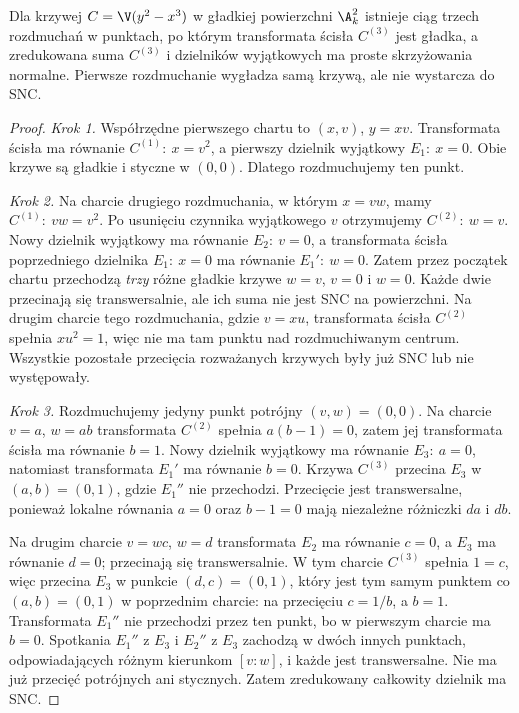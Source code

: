 \begin{twierdzenie}
\label{tw:ga5-embedded-cusp}
Dla krzywej $C=\V(y^2-x^3)$ w gładkiej powierzchni
$\A^2_k$ istnieje ciąg trzech rozdmuchań w punktach,
po którym transformata ścisła $C^{(3)}$ jest gładka,
a zredukowana suma $C^{(3)}$ i dzielników wyjątkowych
ma proste skrzyżowania normalne. Pierwsze rozdmuchanie
wygładza samą krzywą, ale nie wystarcza do SNC.
\end{twierdzenie}
\begin{proof}
\emph{Krok 1.} Współrzędne pierwszego chartu to
$(x,v)$, $y=xv$. Transformata ścisła ma równanie
$C^{(1)}:\ x=v^2$, a pierwszy dzielnik wyjątkowy
$E_1:\ x=0$. Obie krzywe są gładkie i styczne
w $(0,0)$. Dlatego rozdmuchujemy ten punkt.

\emph{Krok 2.} Na charcie drugiego rozdmuchania,
w którym $x=vw$, mamy
$C^{(1)}:\ vw=v^2$. Po usunięciu czynnika
wyjątkowego $v$ otrzymujemy
$C^{(2)}:\ w=v$. Nowy dzielnik wyjątkowy ma
równanie $E_2:\ v=0$, a transformata ścisła
poprzedniego dzielnika $E_1:\ x=0$ ma równanie
$E_1':\ w=0$. Zatem przez początek chartu
przechodzą \emph{trzy} różne gładkie krzywe
$w=v$, $v=0$ i $w=0$. Każde dwie przecinają się
transwersalnie, ale ich suma nie jest SNC na powierzchni.
Na drugim charcie tego rozdmuchania, gdzie $v=xu$,
transformata ścisła $C^{(2)}$ spełnia $xu^2=1$,
więc nie ma tam punktu nad rozdmuchiwanym centrum.
Wszystkie pozostałe przecięcia rozważanych krzywych
były już SNC lub nie występowały.

\emph{Krok 3.} Rozdmuchujemy jedyny punkt potrójny
$(v,w)=(0,0)$. Na charcie $v=a$, $w=ab$
transformata $C^{(2)}$ spełnia
$a(b-1)=0$, zatem jej transformata ścisła ma
równanie $b=1$. Nowy dzielnik wyjątkowy ma
równanie $E_3:\ a=0$, natomiast transformata $E_1'$
ma równanie $b=0$. Krzywa $C^{(3)}$ przecina
$E_3$ w $(a,b)=(0,1)$, gdzie $E_1''$ nie przechodzi.
Przecięcie jest transwersalne, ponieważ lokalne
równania $a=0$ oraz $b-1=0$ mają niezależne
różniczki $da$ i $db$.

Na drugim charcie $v=wc$, $w=d$ transformata
$E_2$ ma równanie $c=0$, a $E_3$ ma równanie
$d=0$; przecinają się transwersalnie. W tym charcie
$C^{(3)}$ spełnia $1=c$, więc przecina $E_3$
w punkcie $(d,c)=(0,1)$, który jest tym samym
punktem co $(a,b)=(0,1)$ w poprzednim charcie:
na przecięciu $c=1/b$, a $b=1$.
Transformata $E_1''$ nie przechodzi przez ten punkt,
bo w pierwszym charcie ma $b=0$. Spotkania
$E_1''$ z $E_3$ i $E_2''$ z $E_3$ zachodzą
w dwóch innych punktach, odpowiadających różnym
kierunkom $[v:w]$, i każde jest transwersalne.
Nie ma już przecięć potrójnych ani stycznych.
Zatem zredukowany całkowity dzielnik ma SNC.
\end{proof}

